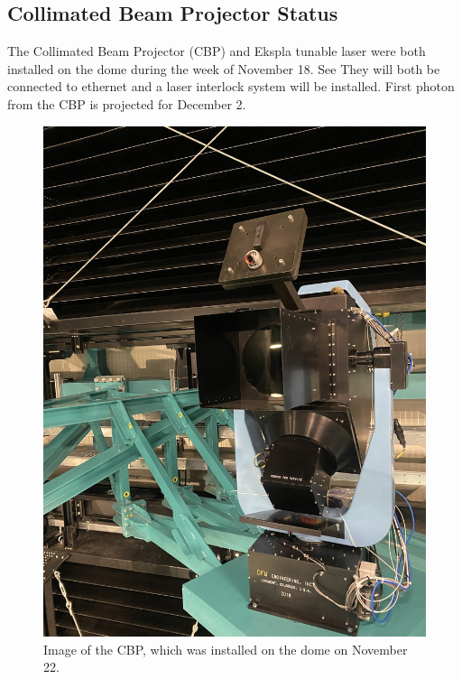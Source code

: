 \subsection{Collimated Beam Projector Status}
\label{sec:cbp}

The Collimated Beam Projector (CBP) and Ekspla tunable laser were both installed on the dome during the week
of November 18. See  They will both be connected to ethernet and a laser interlock system will be installed. First photon from the CBP is projected for December 2.

  
\begin{figure}[htbp]
  \begin{center}
    \includegraphics[height=0.5\textheight]{throughput_for_focused_light_figures/cbp_on_dome_2}
  \end{center}
  \caption{Image of the CBP, which was installed on the dome on November 22.}
  \label{fig:cbp_2}
\end{figure}

